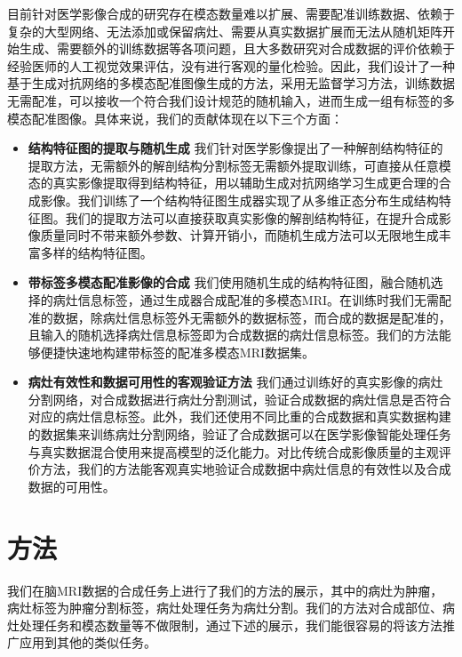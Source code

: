 \documentclass[letterpaper]{article} %
\begin{document}
目前针对医学影像合成的研究存在模态数量难以扩展、需要配准训练数据、依赖于复杂的大型网络、无法添加或保留病灶、需要从真实数据扩展而无法从随机矩阵开始生成、需要额外的训练数据等各项问题，且大多数研究对合成数据的评价依赖于经验医师的人工视觉效果评估，没有进行客观的量化检验。因此，我们设计了一种基于生成对抗网络的多模态配准图像生成的方法，采用无监督学习方法，训练数据无需配准，可以接收一个符合我们设计规范的随机输入，进而生成一组有标签的多模态配准图像。具体来说，我们的贡献体现在以下三个方面：
\begin{itemize}
\item \textbf{结构特征图的提取与随机生成}
我们针对医学影像提出了一种解剖结构特征的提取方法，无需额外的解剖结构分割标签无需额外提取训练，可直接从任意模态的真实影像提取得到结构特征，用以辅助生成对抗网络学习生成更合理的合成影像。我们训练了一个结构特征图生成器实现了从多维正态分布生成结构特征图。我们的提取方法可以直接获取真实影像的解剖结构特征，在提升合成影像质量同时不带来额外参数、计算开销小，而随机生成方法可以无限地生成丰富多样的结构特征图。
\item \textbf{带标签多模态配准影像的合成}
我们使用随机生成的结构特征图，融合随机选择的病灶信息标签，通过生成器合成配准的多模态MRI。在训练时我们无需配准的数据，除病灶信息标签外无需额外的数据标签，而合成的数据是配准的，且输入的随机选择病灶信息标签即为合成数据的病灶信息标签。我们的方法能够便捷快速地构建带标签的配准多模态MRI数据集。
\item \textbf{病灶有效性和数据可用性的客观验证方法}
我们通过训练好的真实影像的病灶分割网络，对合成数据进行病灶分割测试，验证合成数据的病灶信息是否符合对应的病灶信息标签。此外，我们还使用不同比重的合成数据和真实数据构建的数据集来训练病灶分割网络，验证了合成数据可以在医学影像智能处理任务与真实数据混合使用来提高模型的泛化能力。对比传统合成影像质量的主观评价方法，我们的方法能客观真实地验证合成数据中病灶信息的有效性以及合成数据的可用性。
\end{itemize}

\section{方法}
我们在脑MRI数据的合成任务上进行了我们的方法的展示，其中的病灶为肿瘤，病灶标签为肿瘤分割标签，病灶处理任务为病灶分割。我们的方法对合成部位、病灶处理任务和模态数量等不做限制，通过下述的展示，我们能很容易的将该方法推广应用到其他的类似任务。
\end{document}
